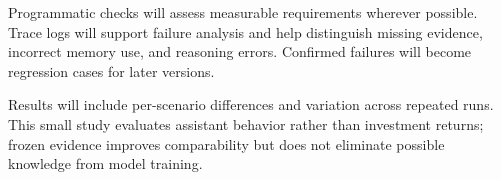 \documentclass{article}
\begin{document}
Programmatic checks will assess measurable requirements wherever possible. Trace logs will
support failure analysis and help distinguish missing evidence, incorrect memory use, and reasoning
errors. Confirmed failures will become regression cases for later versions.

Results will include per-scenario differences and variation across repeated runs. This small
study evaluates assistant behavior rather than investment returns; frozen evidence improves
comparability but does not eliminate possible knowledge from model training.

\nocite{liagents}


\end{document}
